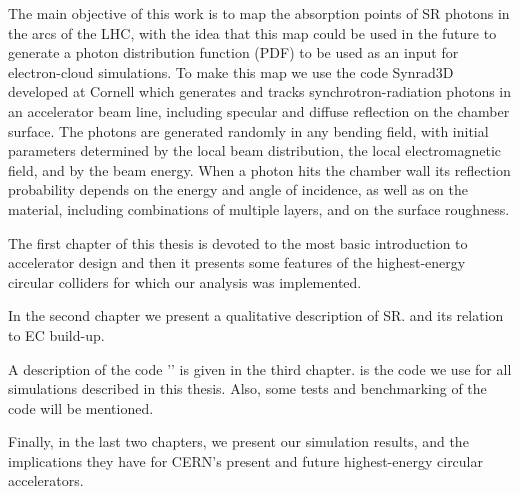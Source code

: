 The main objective of this work is to map the absorption points of SR photons
in the arcs of the LHC, with the idea that this map could be used in the future
to generate a photon distribution function (PDF) to be used as an input for
electron-cloud simulations. To make this map we use the code Synrad3D developed
at Cornell which generates and tracks synchrotron-radiation photons in an
accelerator beam line, including specular and diffuse reflection on the chamber
surface.  The photons are generated randomly in any bending field, with initial
parameters determined by the local beam distribution, the local electromagnetic
field, and by the beam energy.  When a photon hits the chamber wall its
reflection probability depends on the energy and angle of incidence, as well as
on the material, including combinations of multiple layers, and on the surface
roughness.

The first chapter of this thesis is devoted to the most basic introduction to
accelerator design and then it presents some features of the highest-energy
circular colliders for which our analysis was implemented.

In the second chapter we present a qualitative description of SR.  and its
relation to EC build-up. 

A description of the code '\srthree{}' is given in the third chapter. \srthree
is the code we use for all simulations described in this thesis. Also, some
tests and benchmarking of the code will be mentioned.

Finally, in the last two chapters, we present our simulation results, and the
implications they have for CERN's present and future highest-energy circular accelerators. 



